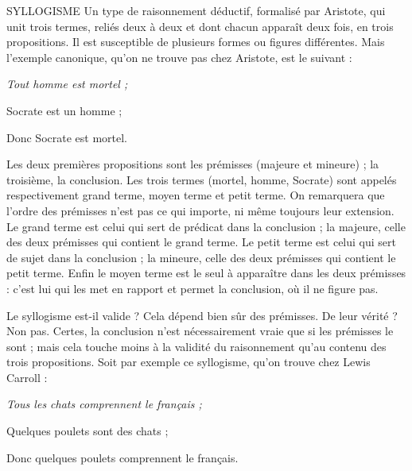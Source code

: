 SYLLOGISME Un type de raisonnement déductif, formalisé par Aristote,
qui unit trois termes, reliés deux à deux et dont chacun apparaît
deux fois, en trois propositions. Il est susceptible de plusieurs formes ou
figures différentes. Mais l'exemple canonique, qu’on ne trouve pas chez Aristote,
est le suivant :
\begin{center}
{\it Tout homme est mortel ;

Socrate est un homme ;

Donc Socrate est mortel.}
\end{center}
Les deux premières propositions sont les prémisses (majeure et mineure) ;
la troisième, la conclusion. Les trois termes (mortel, homme, Socrate) sont
appelés respectivement grand terme, moyen terme et petit terme. On remarquera
que l’ordre des prémisses n’est pas ce qui importe, ni même toujours leur
extension. Le grand terme est celui qui sert de prédicat dans la conclusion ; la
majeure, celle des deux prémisses qui contient le grand terme. Le petit terme
est celui qui sert de sujet dans la conclusion ; la mineure, celle des deux prémisses
qui contient le petit terme. Enfin le moyen terme est le seul à apparaître
dans les deux prémisses : c’est lui qui les met en rapport et permet la conclusion,
où il ne figure pas.

Le syllogisme est-il valide ? Cela dépend bien sûr des prémisses. De leur
vérité ? Non pas. Certes, la conclusion n’est nécessairement vraie que si les prémisses
le sont ; mais cela touche moins à la validité du raisonnement qu’au
contenu des trois propositions. Soit par exemple ce syllogisme, qu’on trouve
chez Lewis Carroll :

\begin{center}
{\it 
Tous les chats comprennent le français ;

Quelques poulets sont des chats ;

Donc quelques poulets comprennent le français.}
\end{center}


